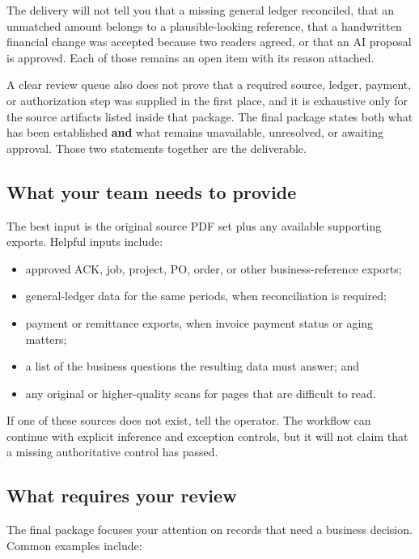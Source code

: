 \documentclass[
]{article}
\providecommand{\tightlist}{%
  \setlength{\itemsep}{0pt}\setlength{\parskip}{0pt}}
\begin{document}
The delivery will not tell you that a missing general ledger reconciled,
that an unmatched amount belongs to a plausible-looking reference, that
a handwritten financial change was accepted because two readers agreed,
or that an AI proposal is approved. Each of those remains an open item
with its reason attached.

A clear review queue also does not prove that a required source, ledger,
payment, or authorization step was supplied in the first place, and it
is exhaustive only for the source artifacts listed inside that package.
The final package states both what has been established \textbf{and}
what remains unavailable, unresolved, or awaiting approval. Those two
statements together are the deliverable.

\subsection{What your team needs to
provide}\label{what-your-team-needs-to-provide}

The best input is the original source PDF set plus any available
supporting exports. Helpful inputs include:

\begin{itemize}
\tightlist
\item
  approved ACK, job, project, PO, order, or other business-reference
  exports;
\item
  general-ledger data for the same periods, when reconciliation is
  required;
\item
  payment or remittance exports, when invoice payment status or aging
  matters;
\item
  a list of the business questions the resulting data must answer; and
\item
  any original or higher-quality scans for pages that are difficult to
  read.
\end{itemize}

If one of these sources does not exist, tell the operator. The workflow
can continue with explicit inference and exception controls, but it will
not claim that a missing authoritative control has passed.

\subsection{What requires your review}\label{what-requires-your-review}

The final package focuses your attention on records that need a business
decision. Common examples include:
\end{document}
